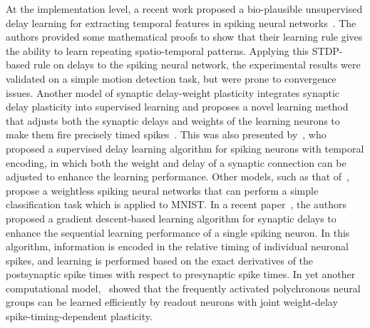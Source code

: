 \documentclass[brainsci, %
               review,accept,pdftex,moreauthors
               ]{Definitions/mdpi}
\begin{document}
At the implementation level, a recent work proposed a bio-plausible unsupervised delay learning for extracting temporal features in spiking neural networks~\citep{nadafian_bio-plausible_2020}. The authors provided some mathematical proofs to show that their learning rule gives the ability to learn repeating spatio-temporal patterns. Applying this STDP-based rule on delays to the spiking neural network, the experimental results were validated on a simple motion detection task, but were prone to convergence issues. Another model of synaptic delay-weight plasticity integrates synaptic delay plasticity into supervised learning and proposes a novel learning method that adjusts both the synaptic delays and weights of the learning neurons to make them fire precisely timed spikes~\citep{zhang_supervised_2020}. This was also presented by~\citep{wang_delay_2019}, who proposed a supervised delay learning algorithm for spiking neurons with temporal encoding, in which both the weight and delay of a synaptic connection can be adjusted to enhance the learning performance. Other models, such as that of~\citep{hazan_memory_2022}, propose a weightless spiking neural networks that can perform a simple classification task which is applied to MNIST. In a recent paper~\citep{luo_supervised_2022}, the authors proposed a gradient descent-based learning algorithm for synaptic delays to enhance the sequential learning performance of a single spiking neuron. In this algorithm, information is encoded in the relative timing of individual neuronal spikes, and learning is performed based on the exact derivatives of the postsynaptic spike times with respect to presynaptic spike times.
In yet another computational model,~\citet{sun_learning_2016} showed that the frequently activated polychronous neural groups can be learned efficiently by readout neurons with joint weight-delay spike-timing-dependent plasticity.

\end{document}
